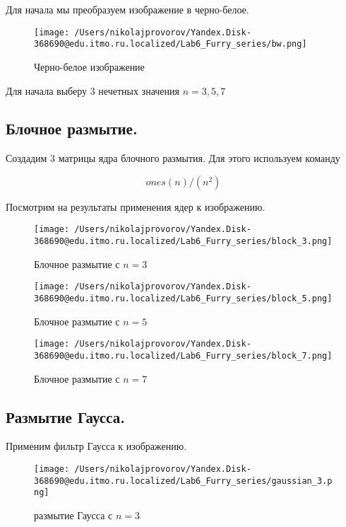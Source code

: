 Для начала мы преобразуем изображение в черно-белое.

\begin{figure}[ht!]
    \centering
    \texttt{[image: /Users/nikolajprovorov/Yandex.Disk-368690@edu.itmo.ru.localized/Lab6\_Furry\_series/bw.png]}
    \caption{Черно-белое изображение}
\end{figure}

Для начала выберу 3 нечетных значения $n = 3, 5, 7$

\subsection{Блочное размытие.}

Создадим 3 матрицы ядра блочного размытия. Для этого используем команду 

\begin{equation}
    ones(n)/(n^2)
\end{equation}

\clearpage

Посмотрим на результаты применения ядер к изображению.

\begin{figure}[ht!]
    \centering
    \texttt{[image: /Users/nikolajprovorov/Yandex.Disk-368690@edu.itmo.ru.localized/Lab6\_Furry\_series/block\_3.png]}
    \caption{Блочное размытие с $n = 3$}
\end{figure}

\begin{figure}[ht!]
    \centering
    \texttt{[image: /Users/nikolajprovorov/Yandex.Disk-368690@edu.itmo.ru.localized/Lab6\_Furry\_series/block\_5.png]}
    \caption{Блочное размытие с $n = 5$}
\end{figure}

\clearpage

\begin{figure}[ht!]
    \centering
    \texttt{[image: /Users/nikolajprovorov/Yandex.Disk-368690@edu.itmo.ru.localized/Lab6\_Furry\_series/block\_7.png]}
    \caption{Блочное размытие с $n = 7$}
\end{figure}

\subsection{Размытие Гаусса.}

Применим фильтр Гаусса к изображению.

\begin{figure}[ht!]
    \centering
    \texttt{[image: /Users/nikolajprovorov/Yandex.Disk-368690@edu.itmo.ru.localized/Lab6\_Furry\_series/gaussian\_3.png]}
    \caption{размытие Гаусса с $n = 3$}
\end{figure}

